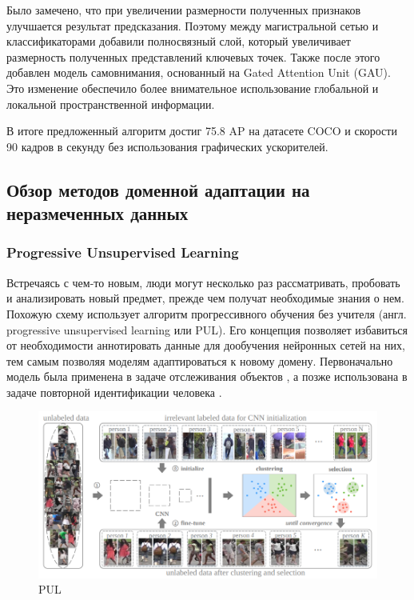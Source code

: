 Было замечено, что при увеличении размерности полученных признаков улучшается результат предсказания. Поэтому между магистральной сетью и классификаторами добавили полносвязный слой, который увеличивает размерность полученных представлений ключевых точек. Также после этого добавлен модель самовнимания, основанный на Gated Attention Unit (GAU). Это изменение обеспечило более внимательное использование глобальной и локальной пространственной информации.


В итоге предложенный алгоритм достиг 75.8 AP на датасете COCO и скорости 90 кадров в секунду без использования графических ускорителей.


\subsection{Обзор методов доменной адаптации на неразмеченных данных}
\label{sec:Chapter4_DA}


\subsubsection*{Progressive Unsupervised Learning}

Встречаясь с чем-то новым, люди могут несколько раз рассматривать, пробовать и анализировать новый предмет, прежде чем получат необходимые знания о нем. Похожую схему использует алгоритм прогрессивного обучения без учителя (англ. progressive unsupervised learning или PUL). Его концепция позволяет избавиться от необходимости аннотировать данные для дообучения нейронных сетей на них, тем самым позволяя моделям адаптироваться к новому домену. Первоначально модель была применена в задаче отслеживания объектов \cite{pul}, а позже использована в задаче повторной идентификации человека \cite{pul_person}.

\begin{figure}[h]
	\centering
	\includegraphics[width=.8\textwidth]{./images/pul}
	\caption{PUL \cite{pul_person}}
	\label{fig:pul}
\end{figure}

